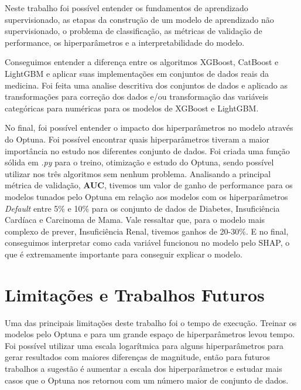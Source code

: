 Neste trabalho foi possível entender os fundamentos de aprendizado supervisionado, as etapas da construção de um modelo de aprendizado não supervisionado, o problema de classificação, as métricas de validação de performance, os hiperparâmetros e a interpretabilidade do modelo.

Conseguimos entender a diferença entre os algoritmos XGBoost, CatBoost e LightGBM e aplicar suas implementações em conjuntos de dados reais da medicina. Foi feita uma analise descritiva dos conjuntos de dados e aplicado as transformações para correção dos dados e/ou transformação das variáveis categóricas para numéricas para os modelos de XGBoost e LightGBM.

No final, foi possível entender o impacto dos hiperparâmetros no modelo através do Optuna. Foi possível encontrar quais hiperparâmetros tiveram a maior importância no estudo nos diferentes conjunto de dados. Foi criada uma função sólida em \textit{.py} para o treino, otimização e estudo do Optuna, sendo possível utilizar nos três algoritmos sem nenhum problema. Analisando a principal métrica de validação, \textbf{AUC}, tivemos um valor de ganho de performance para os modelos tunados pelo Optuna em relação aos modelos com os hiperparâmetros \textit{Default} entre 5\% e 10\% para os conjunto de dados de Diabetes, Insuficiência Cardíaca e Carcinoma de Mama. Vale ressaltar que, para o modelo mais complexo de prever, Insuficiência Renal, tivemos ganhos de 20-30\%. E no final, conseguimos interpretar como cada variável funcionou no modelo pelo SHAP, o que é extremamente importante para conseguir explicar o modelo.

\section{Limitações e Trabalhos Futuros}
Uma das principais limitações deste trabalho foi o tempo de execução. Treinar os modelos pelo Optuna e para um grande espaço de hiperparâmetros levou tempo. Foi possível utilizar uma escala logarítmica para alguns hiperparâmetros para gerar resultados com maiores diferenças de magnitude, então para futuros trabalhos a sugestão é aumentar a escala dos hiperparâmetros e estudar mais casos que o Optuna nos retornou com um número maior de conjunto de dados.